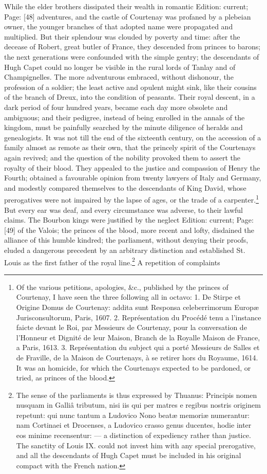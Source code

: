While the elder brothers dissipated their wealth in romantic Edition: current; Page: [48] adventures, and the castle of Courtenay was profaned by a plebeian owner, the younger branches of that adopted name were propagated and multiplied. But their splendour was clouded by poverty and time: after the decease of Robert, great butler of France, they descended from princes to barons; the next generations were confounded with the simple gentry; the descendants of Hugh Capet could no longer be visible in the rural lords of Tanlay and of Champignelles. The more adventurous embraced, without dishonour, the profession of a soldier; the least active and opulent might sink, like their cousins of the branch of Dreux, into the condition of peasants. Their royal descent, in a dark period of four hundred years, became each day more obsolete and ambiguous; and their pedigree, instead of being enrolled in the annals of the kingdom, must be painfully searched by the minute diligence of heralds and genealogists. It was not till the end of the sixteenth century, on the accession of a family almost as remote as their own, that the princely spirit of the Courtenays again revived; and the question of the nobility provoked them to assert the royalty of their blood. They appealed to the justice and compassion of Henry the Fourth; obtained a favourable opinion from twenty lawyers of Italy and Germany, and modestly compared themselves to the descendants of King David, whose prerogatives were not impaired by the lapse of ages, or the trade of a carpenter.\footnote{Of the various petitions, apologies, \&c., published by the princes of Courtenay, I have seen the three following all in octavo: 1. De Stirpe et Origine Domus de Courtenay: addita sunt Responsa celeberrimorum Europæ Jurisconsultorum, Paris, 1607. 2. Représentation du Procédé tenu a l\texthebrew{}’instance faicte devant le Roi, par Messieurs de Courtenay, pour la conversation de l\texthebrew{}’Honneur et Dignité de leur Maison, Branch de la Royalle Maison de France, a Paris, 1613. 3. Représentation du subject qui a porté Messieurs de Salles et de Fraville, de la Maison de Courtenays, à se retirer hors du Royaume, 1614. It was an homicide, for which the Courtenays expected to be pardoned, or tried, as princes of the blood.} But every ear was deaf, and every circumstance was adverse, to their lawful claims. The Bourbon kings were justified by the neglect Edition: current; Page: [49] of the Valois; the princes of the blood, more recent and lofty, disdained the alliance of this humble kindred; the parliament, without denying their proofs, eluded a dangerous precedent by an arbitrary distinction and established St. Louis as the first father of the royal line.\footnote{The sense of the parliaments is thus expressed by Thuanus: Principis nomen nusquam in Galliâ tributum, nisi iis qui per matres e regibus nostris originem repetunt: qui nunc tantum a Ludovico Nono beatæ memoriæ numerantur: nam Cortinaei et Drocenses, a Ludovico crasso genus ducentes, hodie inter eos minime recensentur: \texthebrew{—} a distinction of expediency rather than justice. The sanctity of Louis IX. could not invest him with any special prerogative, and all the descendants of Hugh Capet must be included in his original compact with the French nation.} A repetition of complaints 